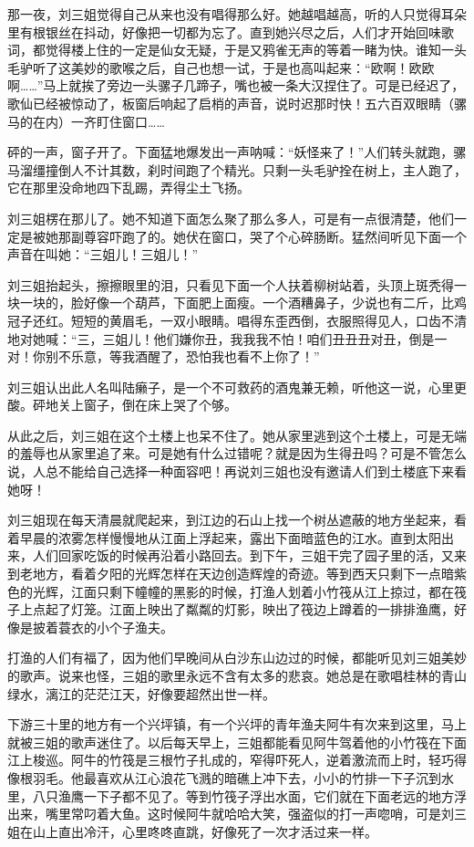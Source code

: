  那一夜，刘三姐觉得自己从来也没有唱得那么好。她越唱越高，听的人只觉得耳朵里有根银丝在抖动，好像把一切都为忘了。直到她兴尽之后，人们才开始回味歌词，都觉得楼上住的一定是仙女无疑，于是又鸦雀无声的等着一睹为快。谁知一头毛驴听了这美妙的歌喉之后，自己也想一试，于是也高叫起来：“欧啊！欧欧啊……”马上就挨了旁边一头骡子几蹄子，嘴也被一条大汉捏住了。可是已经迟了，歌仙已经被惊动了，板窗后响起了启梢的声音，说时迟那时快！五六百双眼睛（骡马的在内）一齐盯住窗口…… 
 
 砰的一声，窗子开了。下面猛地爆发出一声呐喊：“妖怪来了！”人们转头就跑，骡马溜缰撞倒人不计其数，刹时间跑了个精光。只剩一头毛驴拴在树上，主人跑了，它在那里没命地四下乱踢，弄得尘土飞扬。 
 
 刘三姐楞在那儿了。她不知道下面怎么聚了那么多人，可是有一点很清楚，他们一定是被她那副尊容吓跑了的。她伏在窗口，哭了个心碎肠断。猛然间听见下面一个声音在叫她：“三姐儿！三姐儿！” 
 
 刘三姐抬起头，擦擦眼里的泪，只看见下面一个人扶着柳树站着，头顶上斑秃得一块一块的，脸好像一个葫芦，下面肥上面瘦。一个酒糟鼻子，少说也有二斤，比鸡冠子还红。短短的黄眉毛，一双小眼睛。唱得东歪西倒，衣服照得见人，口齿不清地对她喊：“三，三姐儿！他们嫌你丑，我我我不怕！咱们丑丑丑对丑，倒是一对！你别不乐意，等我酒醒了，恐怕我也看不上你了！” 
 
 刘三姐认出此人名叫陆癞子，是一个不可救药的酒鬼兼无赖，听他这一说，心里更酸。砰地关上窗子，倒在床上哭了个够。 
 
 从此之后，刘三姐在这个土楼上也呆不住了。她从家里逃到这个土楼上，可是无端的羞辱也从家里追了来。可是她有什么过错呢？就是因为生得丑吗？可是不管怎么说，人总不能给自己选择一种面容吧！再说刘三姐也没有邀请人们到土楼底下来看她呀！ 
 
 刘三姐现在每天清晨就爬起来，到江边的石山上找一个树丛遮蔽的地方坐起来，看着早晨的浓雾怎样慢慢地从江面上浮起来，露出下面暗蓝色的江水。直到太阳出来，人们回家吃饭的时候再沿着小路回去。到下午，三姐干完了园子里的活，又来到老地方，看着夕阳的光辉怎样在天边创造辉煌的奇迹。等到西天只剩下一点暗紫色的光辉，江面只剩下幢幢的黑影的时候，打渔人划着小竹筏从江上掠过，都在筏子上点起了灯笼。江面上映出了粼粼的灯影，映出了筏边上蹲着的一排排渔鹰，好像是披着蓑衣的小个子渔夫。 
 
 打渔的人们有福了，因为他们早晚间从白沙东山边过的时候，都能听见刘三姐美妙的歌声。说来也怪，三姐的歌里永远不含有太多的悲哀。她总是在歌唱桂林的青山绿水，漓江的茫茫江天，好像要超然出世一样。 
 
 下游三十里的地方有一个兴坪镇，有一个兴坪的青年渔夫阿牛有次来到这里，马上就被三姐的歌声迷住了。以后每天早上，三姐都能看见阿牛驾着他的小竹筏在下面江上梭巡。阿牛的竹筏是三根竹子扎成的，窄得吓死人，逆着激流而上时，轻巧得像根羽毛。他最喜欢从江心浪花飞溅的暗礁上冲下去，小小的竹排一下子沉到水里，八只渔鹰一下子都不见了。等到竹筏子浮出水面，它们就在下面老远的地方浮出来，嘴里常叼着大鱼。这时候阿牛就哈哈大笑，强盗似的打一声唿哨，可是刘三姐在山上直出冷汗，心里咚咚直跳，好像死了一次才活过来一样。 
 
